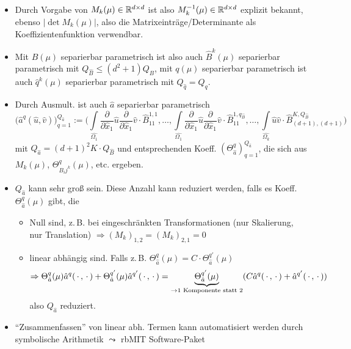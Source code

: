 \begin{bem} \beginwithlistbem
	\begin{itemize}
		\item Durch Vorgabe von $M_k(\mu) \in \mathbb{R}^{d \times d}$ ist also $M_k^{-1} (\mu) \in \mathbb{R}^{d \times d}$ explizit bekannt, ebenso $|\det M_k(\mu)|$, also die Matrixeinträge/Determinante als Koeffizientenfunktion verwendbar.
		\item Mit  $B(\mu)$ separierbar parametrisch ist also auch $\hat{B}^k (\mu)$ separierbar parametrisch mit $Q_{\hat{B}} \leq (d^2 +1)Q_B$, mit $q(\mu)$ separierbar parametrisch ist auch $\hat{q}^k (\mu)$ separierbar parametrisch mit $Q_{\hat{q}} = Q_q$.
		\item Durch Ausmult. ist auch $\hat{a}$ separierbar parametrisch
		\[
			\big( \hat{a}^q(\hat{u},\hat{v}) \big)_{q=1}^{Q_{\hat{a}}} := \big( \int\limits_{\hat{\Omega_1}} \frac{\partial}{\partial \hat{x}_1} \hat{u} \frac{\partial}{\partial\hat{x}_1} \hat{v} \cdot \hat{B}_{1 1}^{1,1} , \dots , \int\limits_{\hat{\Omega_1}} \frac{\partial}{\partial \hat{x}_1} \hat{u} \frac{\partial}{\partial\hat{x}_1} \hat{v} \cdot \hat{B}_{1 1}^{1,q_{\hat{B}}} , \dots , \int\limits_{\hat{\Omega_k}} \hat{u} \hat{v} \cdot \hat{B}_{(d+1), (d+1)}^{K,Q_{\hat{B}}}  \big)
		\]
		mit $Q_{\hat{a}} = (d+1)^2 K \cdot Q_{\hat{B}}$ und entsprechenden Koeff. $\left( \Theta_{\hat{a}}^q \right)_{q=1}^{Q_{\hat{a}}}$, die sich aus $M_k(\mu)$, $\Theta_{B_ij^k}^q (\mu)$, etc. ergeben.
		\item $Q_{\hat{a}}$ kann sehr groß sein. Diese Anzahl kann reduziert werden, falls es Koeff. $\Theta _{\hat{a}}^q (\mu)$ gibt, die
		\begin{itemize}
			\item Null sind, z.\,B. bei eingeschränkten Transformationen (nur Skalierung, nur Translation) $\Rightarrow (M_k)_{1,2} = (M_k)_{2,1} = 0$
			\item linear abhängig sind. Falls z.\,B. $\Theta_{\hat{a}}^q (\mu) = C \cdot \Theta_{\hat{a}}^{q'} (\mu)$
			\[
				\Rightarrow \Theta_{\hat{a}}^q (\mu) \hat{a}^q (\,\cdot\,,\,\cdot\,) + \Theta_{\hat{a}}^{q'} (\mu) \hat{a}^{q'} (\,\cdot\,,\,\cdot\,) = \underbrace{\Theta_{\hat{a}}^{q'} (\mu)}_{\rightarrow \text{1 Komponente statt 2}} ( C \hat{a}^q(\,\cdot\,,\,\cdot\,) + \hat{a}^{q'} (\,\cdot\,,\,\cdot\,) )
			\]
			also $Q_{\hat{a}}$ reduziert.
		\end{itemize}
		\item ``Zusammenfassen'' von linear abh. Termen kann automatisiert werden durch symbolische Arithmetik $\leadsto$ rbMIT Software-Paket

\end{itemize}
\end{bem}
